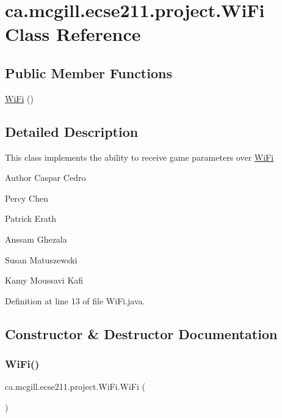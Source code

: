 \hypertarget{classca_1_1mcgill_1_1ecse211_1_1project_1_1_wi_fi}{}\section{ca.\+mcgill.\+ecse211.\+project.\+Wi\+Fi Class Reference}
\label{classca_1_1mcgill_1_1ecse211_1_1project_1_1_wi_fi}
\subsection*{Public Member Functions}
\begin{DoxyCompactItemize}
\item 
\hyperlink{classca_1_1mcgill_1_1ecse211_1_1project_1_1_wi_fi_a0f404abcbaaf147bce3479f6d6e9015a}{Wi\+Fi} ()
\end{DoxyCompactItemize}


\subsection{Detailed Description}
This class implements the ability to receive game parameters over \hyperlink{classca_1_1mcgill_1_1ecse211_1_1project_1_1_wi_fi}{Wi\+Fi}

\begin{DoxyAuthor}{Author}
Caspar Cedro 

Percy Chen 

Patrick Erath 

Anssam Ghezala 

Susan Matuszewski 

Kamy Moussavi Kafi 
\end{DoxyAuthor}


Definition at line 13 of file Wi\+Fi.\+java.



\subsection{Constructor \& Destructor Documentation}
\mbox{\label{classca_1_1mcgill_1_1ecse211_1_1project_1_1_wi_fi_a0f404abcbaaf147bce3479f6d6e9015a}} 
\subsubsection{\texorpdfstring{Wi\+Fi()}{WiFi()}}
{\footnotesize\ttfamily ca.\+mcgill.\+ecse211.\+project.\+Wi\+Fi.\+Wi\+Fi (\begin{DoxyParamCaption}{ }\end{DoxyParamCaption})}

